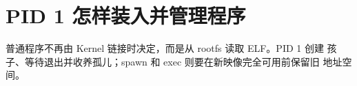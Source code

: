 \chapter{PID 1 怎样装入并管理程序}

普通程序不再由 Kernel 链接时决定，而是从 rootfs 读取 ELF。PID 1 创建
孩子、等待退出并收养孤儿；spawn 和 exec 则要在新映像完全可用前保留旧
地址空间。



